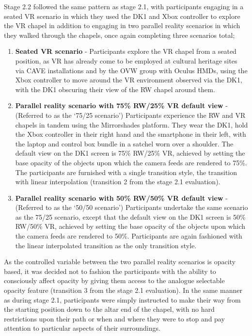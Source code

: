 Stage 2.2 followed the same pattern as stage 2.1, with participants engaging in a seated VR scenario in which they used the DK1 and Xbox controller to explore the VR chapel in addition to engaging in two parallel reality scenarios in which they walked through the chapels, once again completing three scenarios total;

\begin{enumerate}
	\item \textbf{Seated VR scenario} - Participants explore the VR chapel from a seated position, as VR has already come to be employed at cultural heritage sites via CAVE installations and by the OVW group with Oculus HMDs, using the Xbox controller to move around the VR environment observed via the DK1, with the DK1 obscuring their view of the RW chapel around them.
	\item \textbf{Parallel reality scenario with 75\% RW/25\% VR default view} - (Referred to as the `75/25 scenario') Participants experience the RW and VR chapels in tandem using the Mirrorshades platform. They wear the DK1, hold the Xbox controller in their right hand and the smartphone in their left, with the laptop and control box bundle in a satchel worn over a shoulder. The default view on the DK1 screen is 75\% RW/25\% VR, achieved by setting the base opacity of the objects upon which the camera feeds are rendered to 75\%. The participants are furnished with a single transition style, the transition with linear interpolation (transition 2 from the stage 2.1 evaluation).
	\item \textbf{Parallel reality scenario with 50\% RW/50\% VR default view} - (Referred to as the `50/50 scenario') Participants undertake the same scenario as the 75/25 scenario, except that the default view on the DK1 screen is 50\% RW/50\% VR, achieved by setting the base opacity of the objects upon which the camera feeds are rendered to 50\%. Participants are again fashioned with the linear interpolated transition as the only transition style.
\end{enumerate}

As the controlled variable between the two parallel reality scenarios is opacity based, it was decided not to fashion the participants with the ability to consciously affect opacity by giving them access to the analogue selectable opacity feature (transition 3 from the stage 2.1 evaluation). In the same manner as during stage 2.1, participants were simply instructed to make their way from the starting position down to the altar end of the chapel, with no hard restrictions upon their path or when and where they were to stop and pay attention to particular aspects of their surroundings.

